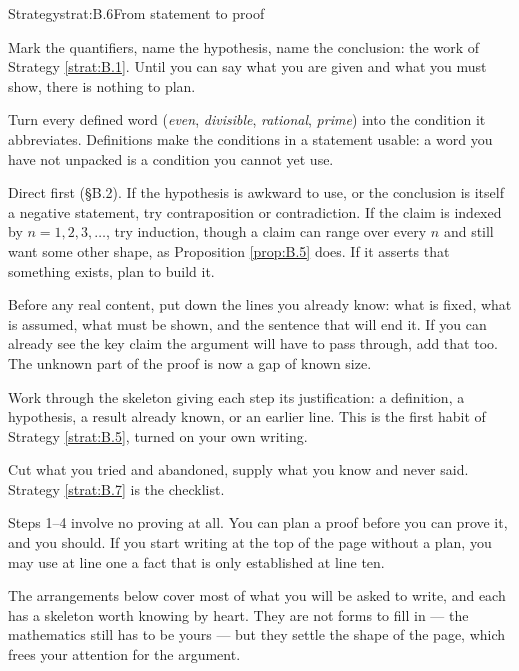 \documentclass[a4paper,12pt,oneside]{memoir}
\begin{document}
\begin{envstrategy}{Strategy}{strat:B.6}{From statement to proof}
\begin{steps}
  \item {} Mark the quantifiers, name the hypothesis, name the conclusion: the work of Strategy \ref{strat:B.1}. Until you can say what you are given and what you must show, there is nothing to plan.
  \item {} Turn every defined word (\emph{even}, \emph{divisible}, \emph{rational}, \emph{prime}) into the condition it abbreviates. Definitions make the conditions in a statement usable: a word you have not unpacked is a condition you cannot yet use.
  \item {} Direct first (§B.2). If the hypothesis is awkward to use, or the conclusion is itself a negative statement, try contraposition or contradiction. If the claim is indexed by \(n = 1, 2, 3, \ldots\), try induction, though a claim can range over every \(n\) and still want some other shape, as Proposition \ref{prop:B.5} does. If it asserts that something exists, plan to build it.
  \item {} Before any real content, put down the lines you already know: what is fixed, what is assumed, what must be shown, and the sentence that will end it. If you can already see the key claim the argument will have to pass through, add that too. The unknown part of the proof is now a gap of known size.
  \item {} Work through the skeleton giving each step its justification: a definition, a hypothesis, a result already known, or an earlier line. This is the first habit of Strategy \ref{strat:B.5}, turned on your own writing.
  \item {} Cut what you tried and abandoned, supply what you know and never said. Strategy \ref{strat:B.7} is the checklist.
\end{steps}
\begin{informal}
Steps 1–4 involve no proving at all. You can plan a proof before you can prove it, and you should. If you start writing at the top of the page without a plan, you may use at line one a fact that is only established at line ten.
\end{informal}
\end{envstrategy}
The arrangements below cover most of what you will be asked to write, and each has a skeleton worth knowing by heart. They are not forms to fill in — the mathematics still has to be yours — but they settle the shape of the page, which frees your attention for the argument.
\end{document}
